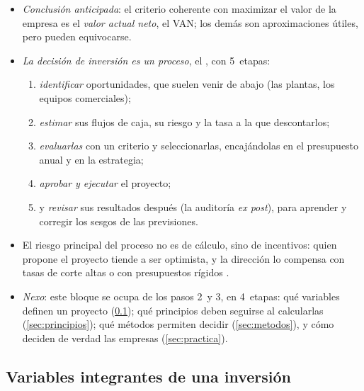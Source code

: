 \documentclass[11pt]{article}
\begin{document}
\begin{itemize}
\item \emph{Conclusión anticipada}: el criterio coherente con maximizar el valor de la empresa es el \emph{valor actual neto}, el VAN; los demás son aproximaciones útiles, pero pueden equivocarse.
\item \emph{La decisión de inversión es un proceso}, el , con 5~etapas\nocite{BrealeyMyersAllen2020Principles}:
  \begin{enumerate}
  \item \emph{identificar} oportunidades, que suelen venir de abajo (las plantas, los equipos comerciales);
  \item \emph{estimar} sus flujos de caja, su riesgo y la tasa a la que descontarlos;
  \item \emph{evaluarlas} con un criterio y seleccionarlas, encajándolas en el presupuesto anual y en la estrategia;
  \item \emph{aprobar y ejecutar} el proyecto;
  \item y \emph{revisar} sus resultados después (la auditoría \emph{ex post}), para aprender y corregir los sesgos de las previsiones.
  \end{enumerate}
\item El riesgo principal del proceso no es de cálculo, sino de incentivos: quien propone el proyecto tiende a ser optimista, y la dirección lo compensa con tasas de corte altas o con presupuestos rígidos .
\item \emph{Nexo}: este bloque se ocupa de los pasos 2~y 3, en 4~etapas: qué variables definen un proyecto (\ref{sec:variables}); qué principios deben seguirse al calcularlas (\ref{sec:principios}); qué métodos permiten decidir (\ref{sec:metodos}), y cómo deciden de verdad las empresas (\ref{sec:practica}).
\end{itemize}

\subsection{Variables integrantes de una inversión}\label{sec:variables}
\end{document}
